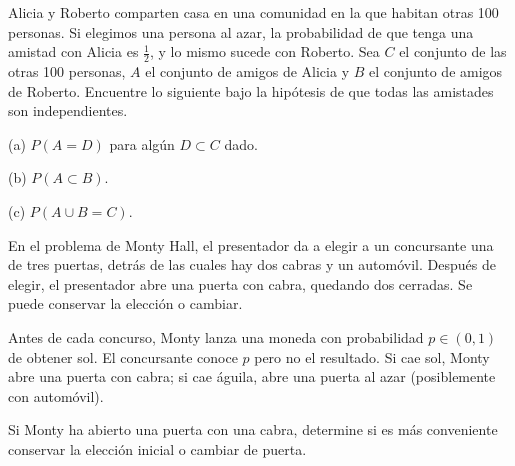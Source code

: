 \documentclass[12pt,a4paper]{article}
\begin{document}
    \begin{mdframed}[style=mdpinkbox,frametitle={Ejercicio 7}]
        Alicia y Roberto comparten casa en una comunidad en la que habitan otras 100 personas.
        Si elegimos una persona al azar, la probabilidad de que tenga una amistad con Alicia es $\frac{1}{2}$,
        y lo mismo sucede con Roberto. Sea $C$ el conjunto de las otras 100 personas, $A$ el conjunto de amigos
        de Alicia y $B$ el conjunto de amigos de Roberto. Encuentre lo siguiente bajo la hipótesis de que
        todas las amistades son independientes.

        (a) $P(A = D)$ para algún $D \subset C$ dado.

        (b) $P(A \subset B)$.

        (c) $P(A \cup B = C)$.
    \end{mdframed}

    \begin{mdframed}[style=mdpinkbox,frametitle={Ejercicio 8}]
        En el problema de Monty Hall, el presentador da a elegir a un concursante una de tres puertas,
        detrás de las cuales hay dos cabras y un automóvil. Después de elegir, el presentador abre una
        puerta con cabra, quedando dos cerradas. Se puede conservar la elección o cambiar.

        Antes de cada concurso, Monty lanza una moneda con probabilidad $p \in (0,1)$ de obtener sol.
        El concursante conoce $p$ pero no el resultado. Si cae sol, Monty abre una puerta con cabra;
        si cae águila, abre una puerta al azar (posiblemente con automóvil).

        Si Monty ha abierto una puerta con una cabra, determine si es más conveniente conservar la elección
        inicial o cambiar de puerta.
    \end{mdframed}
\end{document}
